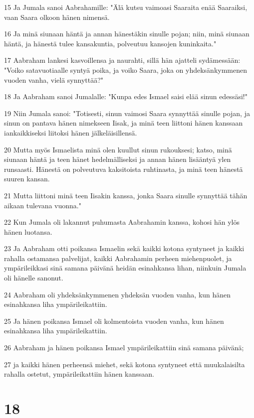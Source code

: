\par 15 Ja Jumala sanoi Aabrahamille: "Älä kutsu vaimoasi Saaraita enää Saaraiksi, vaan Saara olkoon hänen nimensä.
\par 16 Ja minä siunaan häntä ja annan hänestäkin sinulle pojan; niin, minä siunaan häntä, ja hänestä tulee kansakuntia, polveutuu kansojen kuninkaita."
\par 17 Aabraham lankesi kasvoillensa ja naurahti, sillä hän ajatteli sydämessään: "Voiko satavuotiaalle syntyä poika, ja voiko Saara, joka on yhdeksänkymmenen vuoden vanha, vielä synnyttää?"
\par 18 Ja Aabraham sanoi Jumalalle: "Kunpa edes Ismael saisi elää sinun edessäsi!"
\par 19 Niin Jumala sanoi: "Totisesti, sinun vaimosi Saara synnyttää sinulle pojan, ja sinun on pantava hänen nimekseen Iisak, ja minä teen liittoni hänen kanssaan iankaikkiseksi liitoksi hänen jälkeläisillensä.
\par 20 Mutta myös Ismaelista minä olen kuullut sinun rukouksesi; katso, minä siunaan häntä ja teen hänet hedelmälliseksi ja annan hänen lisääntyä ylen runsaasti. Hänestä on polveutuva kaksitoista ruhtinasta, ja minä teen hänestä suuren kansan.
\par 21 Mutta liittoni minä teen Iisakin kanssa, jonka Saara sinulle synnyttää tähän aikaan tulevana vuonna."
\par 22 Kun Jumala oli lakannut puhumasta Aabrahamin kanssa, kohosi hän ylös hänen luotansa.
\par 23 Ja Aabraham otti poikansa Ismaelin sekä kaikki kotona syntyneet ja kaikki rahalla ostamansa palvelijat, kaikki Aabrahamin perheen miehenpuolet, ja ympärileikkasi sinä samana päivänä heidän esinahkansa lihan, niinkuin Jumala oli hänelle sanonut.
\par 24 Aabraham oli yhdeksänkymmenen yhdeksän vuoden vanha, kun hänen esinahkansa liha ympärileikattiin.
\par 25 Ja hänen poikansa Ismael oli kolmentoista vuoden vanha, kun hänen esinahkansa liha ympärileikattiin.
\par 26 Aabraham ja hänen poikansa Ismael ympärileikattiin sinä samana päivänä;
\par 27 ja kaikki hänen perheensä miehet, sekä kotona syntyneet että muukalaisilta rahalla ostetut, ympärileikattiin hänen kanssaan.

\chapter{18}


